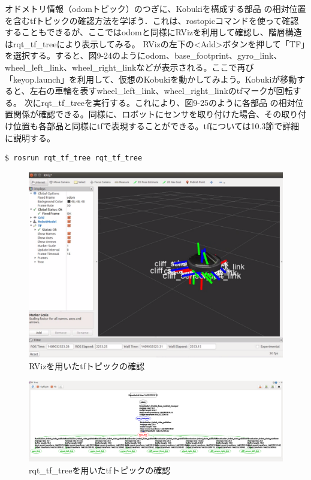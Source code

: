 \begin{itemize}
オドメトリ情報（odomトピック）のつぎに、Kobukiを構成する部品  の相対位置を含むtfトピックの確認方法を学ぼう．これは、rostopicコマンドを使って確認することもできるが、ここではodomと同様にRVizを利用して確認し、階層構造はrqt\_tf\_treeにより表示してみる。
RVizの左下の<Add>ボタンを押して「TF」を選択する。すると、図9-24のようにodom、base\_footprint、gyro\_link、wheel\_left\_link、wheel\_right\_linkなどが表示される。ここで再び「keyop.launch」を利用して、仮想のKobukiを動かしてみよう。Kobukiが移動すると、左右の車輪を表すwheel\_left\_link、wheel\_right\_linkのtfマークが回転する。
次にrqt\_tf\_treeを実行する。これにより、図9-25のように各部品  の相対位置関係が確認できる。同様に、ロボットにセンサを取り付けた場合、その取り付け位置も各部品と同様にtfで表現することができる。tfについては10.3節で詳細に説明する。

\begin{lstlisting}[language=ROS]
$ rosrun rqt_tf_tree rqt_tf_tree
\end{lstlisting}

\begin{figure}[htp]
  \centering
  \includegraphics[width=12cm]{pictures/chapter9/pic_09_24.png}
  \caption{RVizを用いたtfトピックの確認}
\end{figure}

\begin{figure}[htp]
  \centering
  \includegraphics[width=12cm]{pictures/chapter9/pic_09_25.png}
  \caption{rqt\_tf\_treeを用いたtfトピックの確認}
\end{figure}


\end{itemize}
